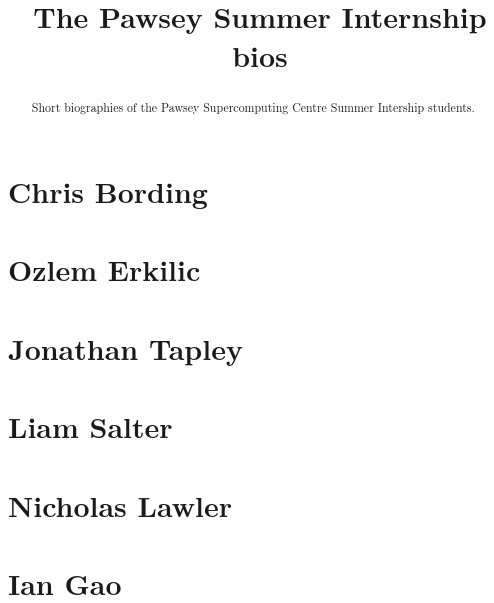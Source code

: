 \documentclass[11pt,a4paper]{report}
\title{The Pawsey Summer Internship bios}
\begin{document}
\maketitle
\tableofcontents


\begin{abstract}

Short biographies of the Pawsey Supercomputing Centre Summer Intership students.

\end{abstract}

\chapter{Chris Bording}



\chapter{Ozlem Erkilic}


\chapter{Jonathan Tapley}


\chapter{Liam Salter}


\chapter{Nicholas Lawler}



\chapter{Ian Gao}

\end{document}
